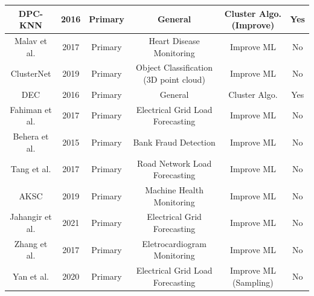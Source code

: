 \begin{table}[h]
\begin{adjustwidth}{-1.5cm}{}
{\begin{minipage}{\textwidth}
\begin{tabular}{@{}cccccc@{}}
    DPC-KNN \cite{Du.Ding.ea_Studydensitypeaks_2016}         & 2016          & Primary       & General                                & Cluster Algo. (Improve)         & Yes         \\ \midrule
    Malav et al. \cite{Malav.Kadam.ea_PREDICTIONHEARTDISEASE_2017}     & 2017          & Primary       & Heart Disease Monitoring               & Improve ML                      & No          \\ \midrule
    ClusterNet \cite{Chen.Li.ea_ClusterNetDeepHierarchical_2019}      & 2019          & Primary       & Object Classification (3D point cloud) & Improve ML                      & No          \\ \midrule
    DEC \cite{Xie.Girshick.ea_UnsupervisedDeepEmbedding_2016}             & 2016          & Primary       & General                                & Cluster Algo.                   & Yes         \\ \midrule
    Fahiman et al. \cite{Fahiman.Erfani.ea_Improvingloadforecasting_2017}   & 2017          & Primary       & Electrical Grid Load Forecasting       & Improve ML                      & No          \\ \midrule
    Behera et al. \cite{Behera.Panigrahi_CreditCardFraud_2015}    & 2015          & Primary       & Bank Fraud Detection                   & Improve ML                      & No          \\ \midrule
    Tang et al. \cite{Tang.Liu.ea_ImprovedFuzzyNeural_2017}     & 2017          & Primary       & Road Network Load Forecasting          & Improve ML                      & No          \\ \midrule
    AKSC \cite{Cheng.Zhu.ea_MachineHealthMonitoring_2019}            & 2019          & Primary       & Machine Health Monitoring              & Improve ML                      & No          \\ \midrule
    Jahangir et al. \cite{Jahangir.Tayarani.ea_DeepLearningBasedForecasting_2021} & 2021          & Primary       & Electrical Grid Forecasting            & Improve ML                      & No          \\ \midrule
    Zhang et al. \cite{Zhang.Wang.ea_PatientspecificECGclassification_2017}    & 2017          & Primary       & Eletrocardiogram Monitoring            & Improve ML                      & No          \\ \midrule
    Yan et al. \cite{Yang.Li.ea_BayesianDeepLearningBased_2020}      & 2020          & Primary       & Electrical Grid Load Forecasting       & Improve ML (Sampling)           & No          \\ \bottomrule
    \end{tabular}
\end{minipage}}
\end{adjustwidth}
    \end{table}












